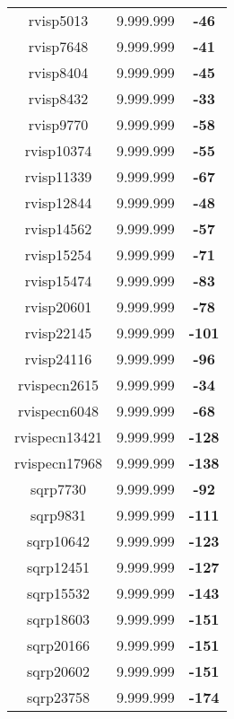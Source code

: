 \begin{tabular}{cc||c}
rvisp5013        & 9.999.999        & {\bf -46}       \\ 
rvisp7648        & 9.999.999        & {\bf -41}       \\ 
rvisp8404        & 9.999.999        & {\bf -45}       \\ 
rvisp8432        & 9.999.999        & {\bf -33}       \\ 
rvisp9770        & 9.999.999        & {\bf -58}       \\ 
rvisp10374       & 9.999.999        & {\bf -55}       \\ 
rvisp11339       & 9.999.999        & {\bf -67}       \\ 
rvisp12844       & 9.999.999        & {\bf -48}       \\ 
rvisp14562       & 9.999.999        & {\bf -57}       \\ 
rvisp15254       & 9.999.999        & {\bf -71}       \\ 
rvisp15474       & 9.999.999        & {\bf -83}       \\ 
rvisp20601       & 9.999.999        & {\bf -78}       \\ 
rvisp22145       & 9.999.999        & {\bf -101}      \\ 
rvisp24116       & 9.999.999        & {\bf -96}       \\ 
rvispecn2615     & 9.999.999        & {\bf -34}       \\ 
rvispecn6048     & 9.999.999        & {\bf -68}       \\ 
rvispecn13421    & 9.999.999        & {\bf -128}      \\ 
rvispecn17968    & 9.999.999        & {\bf -138}      \\ 
sqrp7730         & 9.999.999        & {\bf -92}       \\ 
sqrp9831         & 9.999.999        & {\bf -111}      \\ 
sqrp10642        & 9.999.999        & {\bf -123}      \\ 
sqrp12451        & 9.999.999        & {\bf -127}      \\ 
sqrp15532        & 9.999.999        & {\bf -143}      \\ 
sqrp18603        & 9.999.999        & {\bf -151}      \\ 
sqrp20166        & 9.999.999        & {\bf -151}      \\ 
sqrp20602        & 9.999.999        & {\bf -151}      \\ 
sqrp23758        & 9.999.999        & {\bf -174}      \\ 

\end{tabular}
